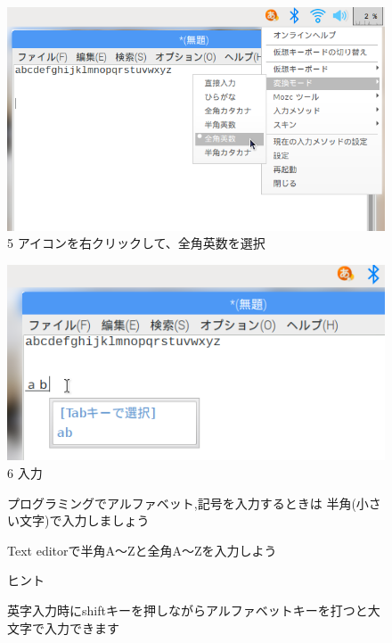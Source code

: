 \documentclass[a4paper,12pt]{jarticle}
\begin{document}
\begin{figure}[ht]
  \begin{minipage}{\textwidth}
    \begin{minipage}{0.45\textwidth}
      \includegraphics[width=0.75\linewidth]{textbook-img069.png}\\
      5 アイコンを右クリックして、全角英数を選択
    \end{minipage}
    \begin{minipage}{2.582cm}
    \end{minipage}
    \begin{minipage}{0.45\textwidth}
      \includegraphics[width=0.75\linewidth]{textbook-img070.png}\\
      6 入力
    \end{minipage}
  \end{minipage}

  \vspace{3mm}
  \begin{minipage}{\textwidth}
    {\centering\large
      プログラミングでアルファベット,記号を入力するときは
      半角(小さい文字)で入力しましょう
    }
  \end{minipage}

  \theQuestion\label{Q:hasAnswer02-5}

  Text editorで半角A〜Zと全角A〜Zを入力しよう

  ヒント


  英字入力時にshiftキーを押しながらアルファベットキーを打つと大文字で入力できます
\end{figure}
\end{document}
